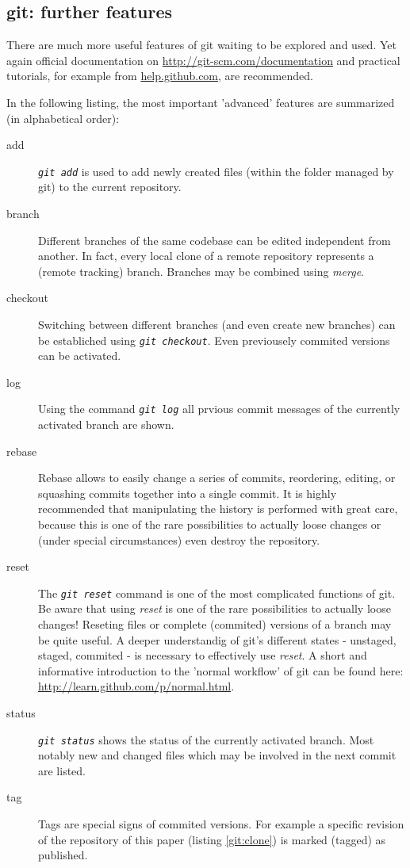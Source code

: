\documentclass{ifacconf}
\begin{document}
\subsection{git: further features}
There are much more useful features of git waiting to be explored and used. Yet again
official documentation on \url{http://git-scm.com/documentation} and practical
tutorials, for example from \url{help.github.com}, are recommended.

In the following listing, the most important 'advanced' features are summarized
(in alphabetical order):
\begin{description}
\item [add] \textit{\lstinline!git add!} is used to add newly created files (within the  folder managed by git) to the current repository.
\item [{branch}] Different branches of the same codebase can be edited independent from
another. In fact, every local clone of a remote repository represents a (remote tracking) 
branch. Branches may be combined using \textit{merge}.
\item [checkout] Switching between different branches (and even create new branches) can
be establiched using \textit{\lstinline!git checkout!}. Even previousely commited versions
can be activated.
\item [log] Using the command \textit{\lstinline!git log!} all prvious commit messages of
the currently activated branch are shown.
\item [{rebase}] Rebase allows to easily change a series of commits, reordering, editing, or squashing commits together into a single commit. It is highly recommended that manipulating the history is performed with great care, because this is one of the rare possibilities to actually loose changes or (under special circumstances) even destroy the repository.
\item [reset] The \textit{\lstinline!git reset!} command is one of the most complicated
functions of git. Be aware that using \textit{reset} is one of the rare
possibilities to actually loose changes! Reseting files or complete (commited) versions
of a branch may be quite useful. A deeper understandig of git's different states -
unstaged, staged, commited - is necessary to effectively use \textit{reset}. A short
and informative introduction to the 'normal workflow' of git can be found here: \url{http://learn.github.com/p/normal.html}.
\item [status] \textit{\lstinline!git status!} shows the status of
the currently activated branch. Most notably new and changed files which may be involved
in the next commit are listed.
\item [tag] Tags are special signs of commited versions. For example a specific revision
of the repository of this paper (listing \ref{git:clone}) is marked (tagged) as published.
\end{description}
\end{document}

